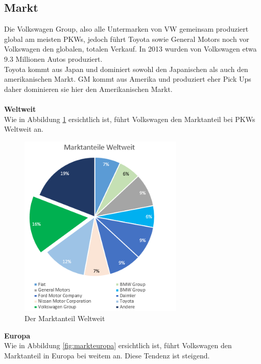 \documentclass[12pt]{article}
\begin{document}
\subsection{Markt}
Die Volkswagen Group, also alle Untermarken von VW gemeinsam produziert global am meisten PKWs, jedoch führt Toyota sowie General Motors noch vor Volkswagen den globalen, totalen Verkauf. 
In 2013 wurden von Volkswagen etwa 9.3 Millionen Autos produziert. \\
Toyota kommt aus Japan und dominiert sowohl den Japanischen als auch den amerikanischen Markt. GM kommt aus Amerika und produziert eher Pick Ups daher dominieren sie hier den Amerikanischen Markt.
\\\\
\textbf{Weltweit}\\
Wie in Abbildung \ref{fig:marktwelt} ersichtlich ist, führt Volkswagen den Marktanteil bei PKWs Weltweit an. 
\begin{figure}[here!]
\centering
\includegraphics[width=0.7\textwidth]{images/maww}
\caption{Der Marktanteil Weltweit}
\label{fig:marktwelt}
\end{figure}\FloatBarrier
\noindent
\textbf{Europa}\\
Wie in Abbildung \ref{fig:markteuropa} ersichtlich ist, führt Volkswagen den Marktanteil in Europa bei weitem an. Diese Tendenz ist steigend.
\end{document}
